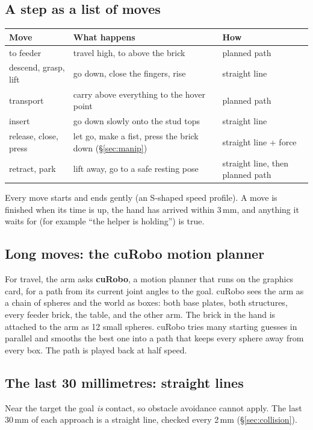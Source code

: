 \documentclass[11pt,a4paper]{article}
\begin{document}
\subsection{A step as a list of moves}

\begin{center}
\small
\begin{tabular}{@{}lll@{}}
\toprule
Move & What happens & How \\
\midrule
to feeder & travel high, to above the brick & planned path \\
descend, grasp, lift & go down, close the fingers, rise & straight line \\
transport & carry above everything to the hover point & planned path \\
insert & go down slowly onto the stud tops & straight line \\
release, close, press & let go, make a fist, press the brick down (\S\ref{sec:manip}) & straight line + force \\
retract, park & lift away, go to a safe resting pose & straight line, then planned path \\
\bottomrule
\end{tabular}
\end{center}

Every move starts and ends gently (an S-shaped speed profile). A move is
finished when its time is up, the hand has arrived within 3\,mm, and anything it
waits for (for example ``the helper is holding'') is true.

\subsection{Long moves: the cuRobo motion planner}
For travel, the arm asks \textbf{cuRobo}, a motion planner that runs on the graphics
card, for a path from its current joint angles to the goal. cuRobo sees the arm as
a chain of spheres and the world as boxes: both base plates, both structures,
every feeder brick, the table, and the other arm. The brick in the hand is
attached to the arm as 12 small spheres. cuRobo tries many starting guesses in
parallel and smooths the best one into a path that keeps every sphere away from
every box. The path is played back at half speed.

\subsection{The last 30 millimetres: straight lines}
Near the target the goal \emph{is} contact, so obstacle avoidance cannot apply. The
last 30\,mm of each approach is a straight line, checked every 2\,mm
(\S\ref{sec:collision}).
\end{document}
